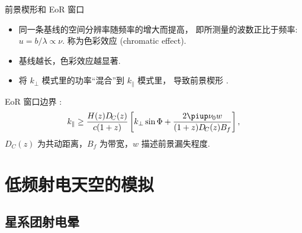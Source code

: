 \documentclass{beamer}
\newcommand{\Cpi}{\piup}  %
\begin{document}
\begin{frame}{前景楔形和 EoR 窗口}
  \begin{itemize}
    \item 同一条基线的空间分辨率随频率的增大而提高，
      即所测量的波数正比于频率: $u = b/\lambda \propto \nu$.
      称为\alert{色彩效应 (chromatic effect)}.
    \item 基线越长，色彩效应越显著.
    \item 将 $k_{\perp}$ 模式里的功率\enquote{混合}到 $k_{\parallel}$ 模式里，
      导致\alert{前景楔形} \cite{morales2012}.
  \end{itemize}

  \vspace{-1ex}
\end{frame}

\begin{frame}
  \alert{EoR 窗口}边界 \cite{thyagarajan2013}:
  \begin{equation}
    \label{eq:eor-window}
    k_{\parallel} \ge
      \frac{H(z) D_{\!C}(z)}{c (1+z)}
      \left[ k_{\perp} \sin\Phi
        + \frac{2\Cpi \nu_0 w}{(1+z) D_{\!C}(z) B_f} \right] ,
  \end{equation}
  $D_{\!C}(z)$ 为共动距离，$B_f$ 为带宽，$w$ 描述前景漏失程度.

  \vspace{-1ex}
\end{frame}


\section{低频射电天空的模拟}

\subsection{星系团射电晕}
\end{document}
